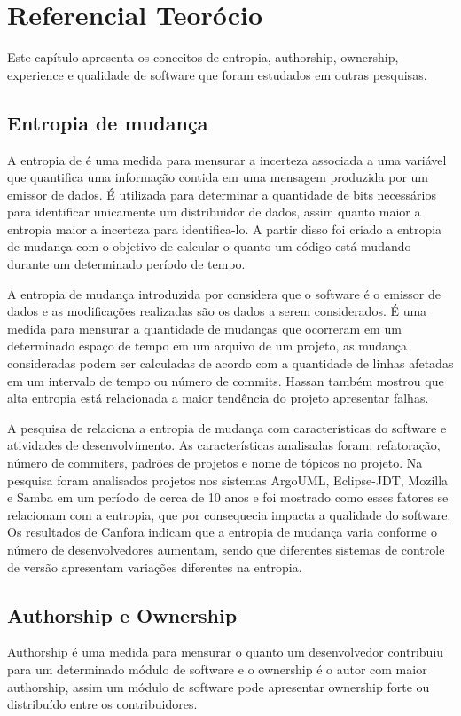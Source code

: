 \chapter{Referencial Teorócio}
Este capítulo apresenta os conceitos de entropia, authorship, ownership, experience e qualidade de software que foram estudados em outras pesquisas.

\section{Entropia de mudança}
A entropia de  é uma medida para mensurar a incerteza associada a uma variável que quantifica uma informação contida em uma mensagem produzida por um emissor de dados. É utilizada para determinar a quantidade de bits necessários para identificar unicamente um distribuidor de dados, assim quanto maior a entropia maior a incerteza para identifica-lo. A partir disso foi criado a entropia de mudança com o objetivo de calcular o quanto um código está mudando durante um determinado período de tempo. 

A entropia de mudança introduzida por  considera que o software é o emissor de dados e as modificações realizadas são os dados a serem considerados. É uma medida para mensurar a quantidade de mudanças que ocorreram em um determinado espaço de tempo em um arquivo de um projeto, as mudança consideradas podem ser calculadas de acordo com a quantidade de linhas afetadas em um intervalo de tempo ou número de commits. Hassan também mostrou que alta entropia está relacionada a maior tendência do projeto apresentar falhas.

A pesquisa de  relaciona a entropia de mudança com características do software e atividades de desenvolvimento. As características analisadas foram: refatoração, número de commiters, padrões de projetos e nome de tópicos no projeto. Na pesquisa foram analisados projetos nos sistemas ArgoUML, Eclipse-JDT, Mozilla e Samba em um período de cerca de 10 anos e foi mostrado como esses fatores se relacionam com a entropia, que por consequecia impacta a qualidade do software. Os resultados de Canfora indicam que a entropia de mudança varia conforme o número de desenvolvedores aumentam, sendo que diferentes sistemas de controle de versão apresentam variações diferentes na entropia.


\section{Authorship e Ownership}
Authorship é uma medida para mensurar o quanto um desenvolvedor contribuiu para um determinado módulo de software e o ownership é o autor com maior authorship, assim um módulo de software pode apresentar ownership forte ou distribuído entre os contribuidores.

